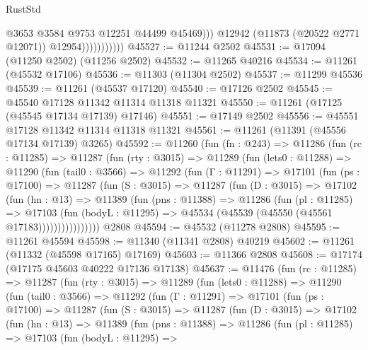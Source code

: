 \begin{lexlean}{RustStd}
\begin{coremodule}
                                @3653
                                @3584
                                @9753
                                @12251
                                @44499
                                @45469)))
                          @12942
                          (@11873 (@20522 @2771 @12071))
                          @12954)))))))))))
@45527 := @11244 @2502
@45531 := @17094 (@11250 @2502) (@11256 @2502)
@45532 := @11265 @40216
@45534 := @11261 (@45532 @17106)
@45536 := @11303 (@11304 @2502)
@45537 := @11299 @45536
@45539 := @11261 (@45537 @17120)
@45540 := @17126 @2502
@45545 := @45540 @17128 @11342 @11314 @11318 @11321
@45550 := @11261 (@17125 (@45545 @17134 @17139) @17146)
@45551 := @17149 @2502
@45556 := @45551 @17128 @11342 @11314 @11318 @11321
@45561 := @11261 (@11391 (@45556 @17134 @17139) @3265)
@45592 := @11260
    (fun (fn : @243) =>
    @11286
      (fun (rc : @11285) =>
      @11287
        (fun (rty : @3015) =>
        @11289
          (fun (lets0 : @11288) =>
          @11290
            (fun (tail0 : @3566) =>
            @11292
              (fun (Γ : @11291) =>
              @17101
                (fun (ps : @17100) =>
                @11287
                  (fun (S : @3015) =>
                  @11287
                    (fun (D : @3015) =>
                    @17102
                      (fun (hn : @13) =>
                      @11389
                        (fun (pns : @11388) =>
                        @11286
                          (fun (pl : @11285) =>
                          @17103
                            (fun (bodyL : @11295) =>
                            @45534 (@45539 (@45550 (@45561 @17183))))))))))))))))
    @2808
@45594 := @45532 (@11278 @2808)
@45595 := @11261 @45594
@45598 := @11340 (@11341 @2808) @40219
@45602 := @11261 (@11332 (@45598 @17165) @17169)
@45603 := @11366 @2808
@45608 := @17174 (@17175 @45603 @40222 @17136 @17138)
@45637 := @11476
    (fun (rc : @11285) =>
    @11287
      (fun (rty : @3015) =>
      @11289
        (fun (lets0 : @11288) =>
        @11290
          (fun (tail0 : @3566) =>
          @11292
            (fun (Γ : @11291) =>
            @17101
              (fun (ps : @17100) =>
              @11287
                (fun (S : @3015) =>
                @11287
                  (fun (D : @3015) =>
                  @17102
                    (fun (hn : @13) =>
                    @11389
                      (fun (pns : @11388) =>
                      @11286
                        (fun (pl : @11285) =>
                        @17103
                          (fun (bodyL : @11295) =>

\end{coremodule}
\end{lexlean}

